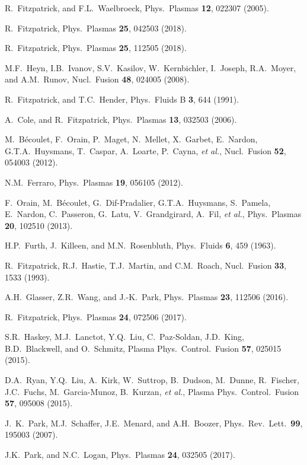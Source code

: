 \documentclass[12pt,prb,aps]{revtex4-1}
\begin{document}
\begin{thebibliography}{99}
 R.~Fitzpatrick, and F.L.~Waelbroeck, Phys.\ Plasmas {\bf 12}, 022307 (2005).

 R.~Fitzpatrick, Phys.\ Plasmas {\bf 25}, 042503 (2018).

 R.~Fitzpatrick, Phys.\ Plasmas {\bf 25}, 112505 (2018).

 M.F.~Heyn, I.B.~Ivanov, S.V.~Kasilov, W.~Kernbichler, I.~Joseph, R.A.~Moyer,  and A.M.~Runov, Nucl.\ Fusion {\bf 48}, 024005 (2008). 

 R.~Fitzpatrick, and T.C.~Hender, Phys.\ Fluids B {\bf 3}, 644 (1991).

 A.~Cole, and R.~Fitzpatrick, Phys.\ Plasmas {\bf 13}, 032503 (2006).


 M.~B\'{e}coulet, F.~Orain, P.~Maget, N.~Mellet, X.~Garbet, E.~Nardon, G.T.A.~Huysmans, T.~Caspar, A.~Loarte,  P.~Cayna, {\em et al.}, 
Nucl.\ Fusion {\bf 52}, 054003  (2012).

 N.M.~Ferraro, Phys.\ Plasmas {\bf 19}, 056105  (2012).

 F.~Orain, M.~B\'{e}coulet, G.~Dif-Pradalier, G.T.A.~Huysmans, S.~Pamela,   E.~Nardon, C.~Passeron, G.~Latu, V.~Grandgirard, A.~Fil, {\em et al.}, 
Phys.\ Plasmas {\bf 20}, 102510 (2013). 

 H.P.~Furth,  J.~Killeen, and M.N.~Rosenbluth,  Phys.\ Fluids {\bf 6}, 459 (1963).

 R.~Fitzpatrick, R.J.~Hastie, T.J.~Martin, and C.M.~Roach, Nucl.\ Fusion {\bf 33}, 1533 (1993).

 A.H.~Glasser, Z.R.~Wang, and J.-K.~Park, Phys.\ Plasmas {\bf 23}, 112506 (2016).

 R.~Fitzpatrick, Phys.\ Plasmas {\bf 24}, 072506 (2017). 

 S.R.~Haskey, M.J.~Lanctot, Y.Q.~Liu, C.~Paz-Soldan, J.D.~King, B.D.~Blackwell, and O.~Schmitz,  Plasma 
Phys.\ Control.\ Fusion {\bf 57}, 025015 (2015).

 D.A.~Ryan,  Y.Q.~Liu, A.~Kirk, W.~Suttrop, B.~Dudson, M.~Dunne, R.~Fischer, J.C.~Fuchs, M.~Garcia-Munoz, B.~Kurzan, {\it et al.}, 
Plasma Phys.\ Control.\ Fusion {\bf 57}, 095008 (2015).

 J.~K.~Park, M.J.~Schaffer, J.E.~Menard, and A.H.~Boozer, Phys.\ Rev.\ Lett.\ {\bf 99}, 195003 (2007).

 J.K.~Park, and N.C.~Logan, Phys.\ Plasmas {\bf 24}, 032505 (2017).


\end{thebibliography}
\end{document}
